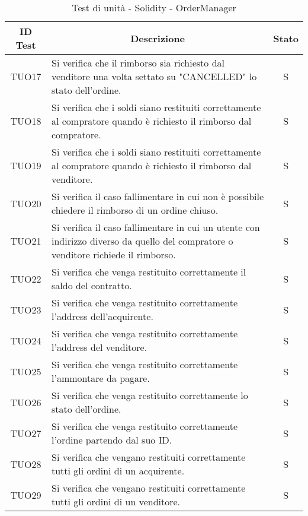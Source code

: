 \begin{table}[H]
  \centering
  \renewcommand{\arraystretch}{1.8}
  \begin{tabular}{c|p{10cm}|c}
    \rowcolor[HTML]{125E28}
    \color[HTML]{FFFFFF}\textbf{ID Test}
         & \multicolumn{1}{c}{\color[HTML]{FFFFFF}\textbf{Descrizione}}
         & \color[HTML]{FFFFFF}\textbf{Stato}                                                                                                               \\
    \hline
    TUO17 & Si verifica che il rimborso sia richiesto dal venditore una volta settato su "CANCELLED" lo stato dell'ordine.                              & S \\
    TUO18 & Si verifica che i soldi siano restituiti correttamente al compratore quando è richiesto il rimborso dal compratore.                         & S \\
    TUO19 & Si verifica che i soldi siano restituiti correttamente al compratore quando è richiesto il rimborso dal venditore.                          & S \\
    TUO20 & Si verifica il caso fallimentare in cui non è possibile chiedere il rimborso di un ordine chiuso.                                           & S \\
    TUO21 & Si verifica il caso fallimentare in cui un utente con indirizzo diverso da quello del compratore o venditore richiede il rimborso.          & S \\
    TUO22 & Si verifica che venga restituito correttamente il saldo del contratto.                                                                      & S \\
    TUO23 & Si verifica che venga restituito correttamente l'address dell'acquirente.                                                                   & S \\
    TUO24 & Si verifica che venga restituito correttamente l'address del venditore.                                                                     & S \\
    TUO25 & Si verifica che venga restituito correttamente l'ammontare da pagare.                                                                       & S \\
    TUO26 & Si verifica che venga restituito correttamente lo stato dell'ordine.                                                                        & S \\
    TUO27 & Si verifica che venga restituito correttamente l'ordine partendo dal suo ID.                                                                & S \\
    TUO28 & Si verifica che vengano restituiti correttamente tutti gli ordini di un acquirente.                                                         & S \\
    TUO29 & Si verifica che vengano restituiti correttamente tutti gli ordini di un venditore.                                                          & S \\
  \end{tabular}
  \caption{Test di unità - Solidity - OrderManager}
\end{table}
